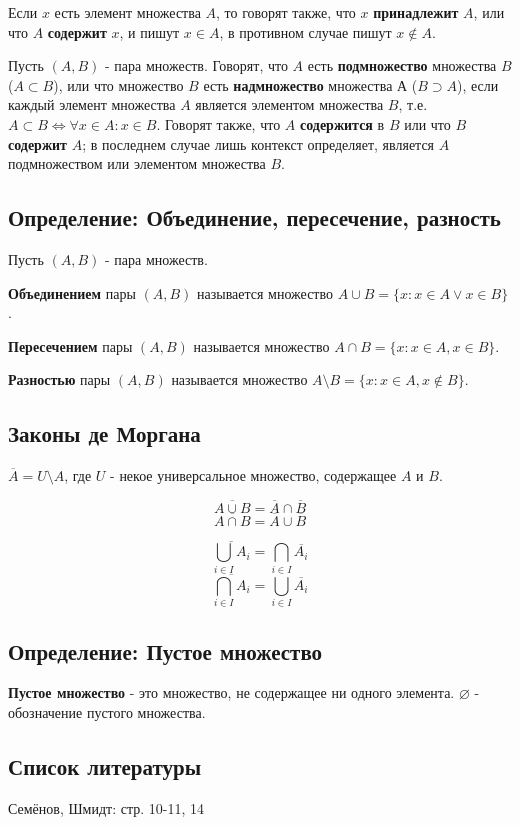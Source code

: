 \documentclass{article}
\begin{document}
Если $x$ есть элемент множества $A$, то говорят также, что $x$ \textbf{принадлежит} $A$, или что $A$ \textbf{содержит} $x$, и пишут $x \in A$, в противном случае пишут $x \notin A$.

Пусть $(A, B)$ - пара множеств. Говорят, что $A$ есть \textbf{подмножество} множества $B$ ($A \subset B$), или что множество $B$ есть \textbf{надмножество} множества А ($B \supset A$), если каждый элемент множества $A$ является элементом множества $B$, т.е. $A \subset B \Leftrightarrow \forall x \in A : x \in B$. Говорят также, что $A$ \textbf{содержится} в $B$ или что $B$ \textbf{содержит} $A$; в последнем случае лишь контекст определяет, является $A$ подмножеством или элементом множества $B$.

\subsection{Определение: Объединение, пересечение, разность}

Пусть $(A, B)$ - пара множеств.

\textbf{Объединением} пары $(A, B)$ называется множество $A \cup B = \{x : x \in A \vee x \in B \}$.

\textbf{Пересечением} пары $(A, B)$ называется множество $A \cap B = \{x : x \in A, x \in B \}$.

\textbf{Разностью} пары $(A, B)$ называется множество $A \setminus B = \{x : x \in A, x \notin B \}$.

\subsection{Законы де Моргана}

$\overline A = U \setminus A$, где $U$ - некое универсальное множество, содержащее $A$ и $B$.

\[\overline{A \cup B} = \overline A \cap \overline B \]
\[\overline{A \cap B} = \overline A \cup \overline B \]

\[\overline{\bigcup_{i\in I} A_i} = \bigcap_{i\in I}\overline{A_i}\]
\[\overline{\bigcap_{i\in I} A_i} = \bigcup_{i\in I}\overline{A_i}\]

\subsection{Определение: Пустое множество}
\textbf{Пустое множество} - это множество, не содержащее ни одного элемента. $\varnothing$ - обозначение пустого множества.

\subsection*{Список литературы}
Семёнов, Шмидт: стр. 10-11, 14
\end{document}
